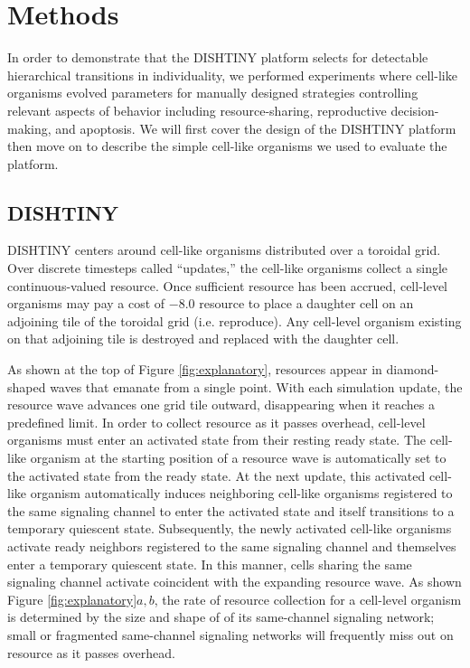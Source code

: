 \section{Methods}

In order to demonstrate that the DISHTINY platform selects for detectable hierarchical transitions in individuality, we performed experiments where cell-like organisms evolved parameters for manually designed strategies controlling relevant aspects of behavior including resource-sharing, reproductive decision-making, and apoptosis.
We will first cover the design of the DISHTINY platform then move on to describe the simple cell-like organisms we used to evaluate the platform.

\subsection{DISHTINY}



DISHTINY centers around cell-like organisms distributed over a toroidal grid.
Over discrete timesteps called ``updates,'' the cell-like organisms collect a single continuous-valued resource.
Once sufficient resource has been accrued, cell-level organisms may pay a cost of $-8.0$ resource to place a daughter cell on an adjoining tile of the toroidal grid (i.e. reproduce).
Any cell-level organism existing on that adjoining tile is destroyed and replaced with the daughter cell.

As shown at the top of Figure \ref{fig:explanatory}, resources appear in diamond-shaped waves that emanate from a single point.
With each simulation update, the resource wave advances one grid tile outward, disappearing when it reaches a predefined limit.
In order to collect resource as it passes overhead, cell-level organisms must enter an activated state from their resting ready state.
The cell-like organism at the starting position of a resource wave is automatically set to the activated state from the ready state.
At the next update, this activated cell-like organism automatically induces neighboring cell-like organisms registered to the same signaling channel to enter the activated state and itself transitions to a temporary quiescent state.
Subsequently, the newly activated cell-like organisms activate ready neighbors registered to the same signaling channel and themselves enter a temporary quiescent state.
In this manner, cells sharing the same signaling channel activate coincident with the expanding resource wave.
As shown Figure \ref{fig:explanatory}$a,b$, the rate of resource collection for a cell-level organism is determined by the size and shape of of its same-channel signaling network;
small or fragmented same-channel signaling networks will frequently miss out on resource as it passes overhead.

